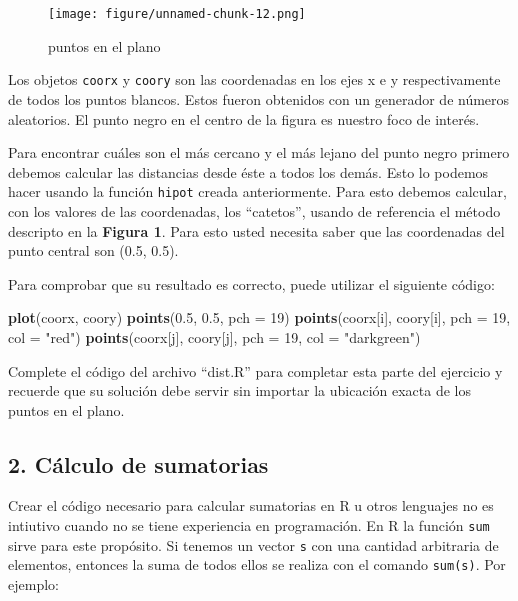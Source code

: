 \documentclass[]{article}
\newenvironment{Shaded}{}{}
\newcommand{\KeywordTok}[1]{\textcolor[rgb]{0.00,0.44,0.13}{\textbf{{#1}}}}
\newcommand{\DataTypeTok}[1]{\textcolor[rgb]{0.56,0.13,0.00}{{#1}}}
\newcommand{\DecValTok}[1]{\textcolor[rgb]{0.25,0.63,0.44}{{#1}}}
\newcommand{\FloatTok}[1]{\textcolor[rgb]{0.25,0.63,0.44}{{#1}}}
\newcommand{\StringTok}[1]{\textcolor[rgb]{0.25,0.44,0.63}{{#1}}}
\newcommand{\NormalTok}[1]{{#1}}
\begin{document}
\begin{figure}[htbp]
\centering
\texttt{[image: figure/unnamed-chunk-12.png]}
\caption{puntos en el plano}
\end{figure}

Los objetos \texttt{coorx} y \texttt{coory} son las coordenadas en los
ejes x e y respectivamente de todos los puntos blancos. Estos fueron
obtenidos con un generador de números aleatorios. El punto negro en el
centro de la figura es nuestro foco de interés.

Para encontrar cuáles son el más cercano y el más lejano del punto negro
primero debemos calcular las distancias desde éste a todos los demás.
Esto lo podemos hacer usando la función \texttt{hipot} creada
anteriormente. Para esto debemos calcular, con los valores de las
coordenadas, los ``catetos'', usando de referencia el método descripto
en la \textbf{Figura 1}. Para esto usted necesita saber que las
coordenadas del punto central son (0.5, 0.5).

Para comprobar que su resultado es correcto, puede utilizar el siguiente
código:

\begin{Shaded}
\begin{Highlighting}[]
\KeywordTok{plot}\NormalTok{(coorx, coory)}
\KeywordTok{points}\NormalTok{(}\FloatTok{0.5}\NormalTok{, }\FloatTok{0.5}\NormalTok{, }\DataTypeTok{pch =} \DecValTok{19}\NormalTok{)}
\KeywordTok{points}\NormalTok{(coorx[i], coory[i], }\DataTypeTok{pch =} \DecValTok{19}\NormalTok{, }\DataTypeTok{col =} \StringTok{"red"}\NormalTok{)}
\KeywordTok{points}\NormalTok{(coorx[j], coory[j], }\DataTypeTok{pch =} \DecValTok{19}\NormalTok{, }\DataTypeTok{col =} \StringTok{"darkgreen"}\NormalTok{)}
\end{Highlighting}
\end{Shaded}
Complete el código del archivo ``dist.R'' para completar esta parte del
ejercicio y recuerde que su solución debe servir sin importar la
ubicación exacta de los puntos en el plano.

\subsection{2. Cálculo de sumatorias}

Crear el código necesario para calcular sumatorias en R u otros
lenguajes no es intiutivo cuando no se tiene experiencia en
programación. En R la función \texttt{sum} sirve para este propósito. Si
tenemos un vector \texttt{s} con una cantidad arbitraria de elementos,
entonces la suma de todos ellos se realiza con el comando
\texttt{sum(s)}. Por ejemplo:
\end{document}
